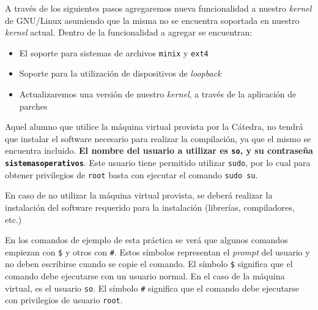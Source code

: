 A través de los siguientes pasos agregaremos nueva funcionalidad a nuestro
\textit{kernel} de GNU/Linux asumiendo que la misma no se encuentra soportada en
nuestro \textit{kernel} actual. Dentro de la funcionalidad a agregar se encuentran:

\begin{itemize}
\item El soporte para sistemas de archivos \texttt{minix} y \texttt{ext4}
\item Soporte para la utilización de dispositivos de \textit{loopback}
\item Actualizaremos una versión de nuestro \textit{kernel}, a través de la aplicación de
parches
\end{itemize}

Aquel alumno que utilice la máquina virtual provista por la Cátedra, no
tendrá que instalar el software necesario para realizar la compilación, ya
que el mismo se encuentra incluido. \textbf{El nombre del usuario a utilizar es
\texttt{so}, y su contraseña \texttt{sistemasoperativos}}. Este usuario
tiene permitido utilizar \texttt{sudo}, por lo cual para obtener
privilegios de \texttt{root} basta con ejecutar el comando \texttt{sudo
  su}.

En caso de no utilizar la máquina virtual provista, se deberá realizar la
instalación del software requerido para la instalación (librerías,
compiladores, etc.)

En los comandos de ejemplo de esta práctica se verá que algunos comandos
empiezan con \texttt{\$} y otros con \texttt{\#}. Estos símbolos
representan el \textit{prompt} del usuario y no deben escribirse cuando se
copie el comando. El símbolo \texttt{\$} significa que el comando debe
ejecutarse con un usuario normal. En el caso de la máquina virtual, es el
usuario \texttt{so}. El símbolo \texttt{\#} significa que el comando debe
ejecutarse con privilegios de usuario \texttt{root}.

